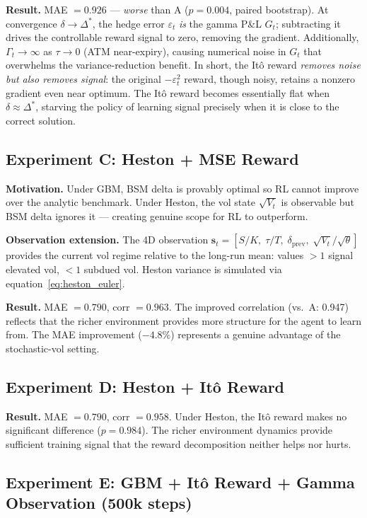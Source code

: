 \documentclass[12pt,a4paper]{article}
\begin{document}
\textbf{Result.}  MAE $= 0.926$ --- \emph{worse} than A ($p=0.004$, paired
bootstrap).  At convergence $\delta\to\Delta^*$, the hedge error $\varepsilon_t$
\emph{is} the gamma P\&L $G_t$; subtracting it drives the controllable reward
signal to zero, removing the gradient.  Additionally, $\Gamma_t\to\infty$ as
$\tau\to 0$ (ATM near-expiry), causing numerical noise in $G_t$ that
overwhelms the variance-reduction benefit.
In short, the It\^{o} reward \emph{removes noise but also removes signal}: the
original $-\varepsilon_t^2$ reward, though noisy, retains a nonzero gradient
even near optimum.  The It\^{o} reward becomes essentially flat when
$\delta\approx\Delta^*$, starving the policy of learning signal precisely when
it is close to the correct solution.

\subsection{Experiment C: Heston + MSE Reward}

\textbf{Motivation.}  Under GBM, BSM delta is provably optimal so RL cannot
improve over the analytic benchmark.  Under Heston, the vol state $\sqrt{V_t}$
is observable but BSM delta ignores it --- creating genuine scope for RL to
outperform.

\textbf{Observation extension.}  The 4D observation
$\mathbf{s}_t = [S/K,\;\tau/T,\;\delta_{\mathrm{prev}},\;\sqrt{V_t}/\sqrt{\theta}]$
provides the current vol regime relative to the long-run mean: values $>1$
signal elevated vol, $<1$ subdued vol.  Heston variance is simulated via
equation~\eqref{eq:heston_euler}.

\textbf{Result.}  MAE $= 0.790$, corr $= 0.963$.  The improved correlation
(vs.\ A: 0.947) reflects that the richer environment provides more
structure for the agent to learn from.  The MAE improvement ($-4.8\%$)
represents a genuine advantage of the stochastic-vol setting.

\subsection{Experiment D: Heston + It\^{o} Reward}

\textbf{Result.}  MAE $= 0.790$, corr $= 0.958$.  Under Heston, the
It\^{o} reward makes no significant difference ($p = 0.984$).  The richer
environment dynamics provide sufficient training signal that the reward
decomposition neither helps nor hurts.

\subsection{Experiment E: GBM + It\^{o} Reward + Gamma Observation (500k steps)}
\label{sec:gamma_obs}
\end{document}
